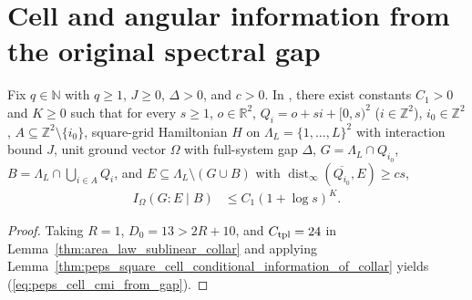 \section{Cell and angular information from the original spectral gap}
\label{sec:peps_angular_information_from_gap}

\begin{lemma}
    \label{thm:peps_cell_conditional_information_from_gap}
    \leanok
    Fix $q\in\mathbb N$ with $q\ge1$, $J\ge0$, $\Delta>0$, and $c>0$.
    In \cite[Lemma~3.2]{OpenAI2026PolynomialPEPS}, there exist constants $C_1>0$ and $K\ge0$ such that for every $s\ge1$, $o\in\mathbb R^2$, $Q_i=o+si+[0,s)^2$ ($i\in\mathbb Z^2$), $i_0\in\mathbb Z^2$, $A\subseteq\mathbb Z^2\setminus\{i_0\}$, square-grid Hamiltonian $H$ on $\Lambda_L=\{1,\ldots,L\}^2$ with interaction bound $J$, unit ground vector $\Omega$ with full-system gap $\Delta$, $G=\Lambda_L\cap Q_{i_0}$, $B=\Lambda_L\cap\bigcup_{i\in A}Q_i$, and $E\subseteq\Lambda_L\setminus(G\cup B)$ with $\operatorname{dist}_\infty(\overline{Q_{i_0}},E)\ge cs$,
    \begin{align}
        I_\Omega(G:E\mid B) & \le C_1(1+\log s)^K.
        \label{eq:peps_cell_cmi_from_gap}
    \end{align}
\end{lemma}
\begin{proof}\leanok
    Taking $R=1$, $D_0=13>2R+10$, and $C_{\rm tpl}=24$ in Lemma~\ref{thm:area_law_sublinear_collar} and applying Lemma~\ref{thm:peps_square_cell_conditional_information_of_collar} yields (\ref{eq:peps_cell_cmi_from_gap}).
\end{proof}

